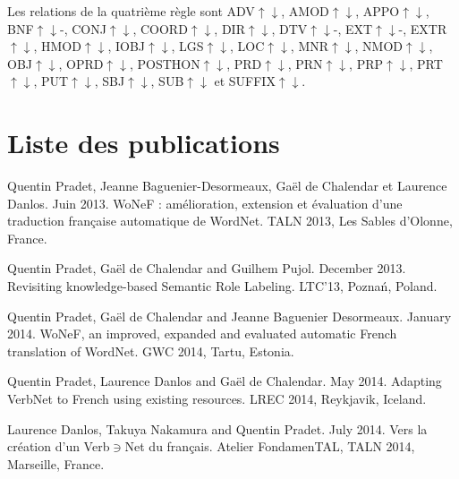 \documentclass[oneside,parskip,draft]{scrbook}
\begin{document}
Les relations de la quatrième règle sont ADV$\uparrow\downarrow$,
AMOD$\uparrow\downarrow$, APPO$\uparrow\downarrow$, BNF$\uparrow\downarrow$-,
CONJ$\uparrow\downarrow$, COORD$\uparrow\downarrow$, DIR$\uparrow\downarrow$,
DTV$\uparrow\downarrow$-, EXT$\uparrow\downarrow$-, EXTR$\uparrow\downarrow$,
HMOD$\uparrow\downarrow$, IOBJ$\uparrow\downarrow$, LGS$\uparrow\downarrow$,
LOC$\uparrow\downarrow$, MNR$\uparrow\downarrow$, NMOD$\uparrow\downarrow$,
OBJ$\uparrow\downarrow$, OPRD$\uparrow\downarrow$, POSTHON$\uparrow\downarrow$,
PRD$\uparrow\downarrow$, PRN$\uparrow\downarrow$, PRP$\uparrow\downarrow$,
PRT$\uparrow\downarrow$, PUT$\uparrow\downarrow$, SBJ$\uparrow\downarrow$,
SUB$\uparrow\downarrow$ et SUFFIX$\uparrow\downarrow$.

\chapter{Liste des publications}

Quentin Pradet, Jeanne Baguenier-Desormeaux, Gaël de Chalendar et Laurence Danlos. Juin 2013. WoNeF : amélioration, extension et évaluation d’une traduction française automatique de WordNet. TALN 2013, Les Sables d'Olonne, France.

Quentin Pradet, Gaël de Chalendar and Guilhem Pujol. December 2013. Revisiting knowledge-based Semantic Role Labeling. LTC'13, Poznań, Poland.

Quentin Pradet, Gaël de Chalendar and Jeanne Baguenier Desormeaux. January 2014. WoNeF, an improved, expanded and evaluated automatic French translation of WordNet. GWC 2014, Tartu, Estonia.

Quentin Pradet, Laurence Danlos and Gaël de Chalendar. May 2014. Adapting VerbNet to French using existing resources. LREC 2014, Reykjavik, Iceland.

Laurence Danlos, Takuya Nakamura and Quentin Pradet. July 2014. Vers la création d’un Verb$\ni$Net du français. Atelier FondamenTAL, TALN 2014, Marseille, France.


\printglossary
\end{document}
